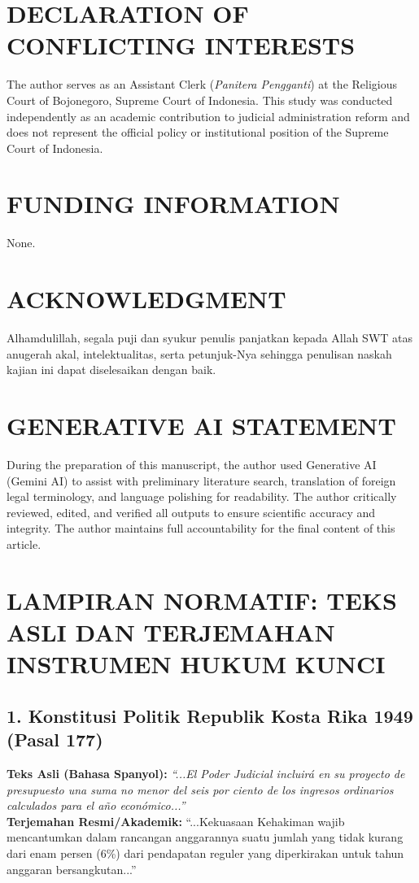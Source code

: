 \documentclass[12pt, a4paper]{article}
\begin{document}
\newpage
\section*{DECLARATION OF CONFLICTING INTERESTS}
The author serves as an Assistant Clerk (\textit{Panitera Pengganti}) at the Religious Court of Bojonegoro, Supreme Court of Indonesia. This study was conducted independently as an academic contribution to judicial administration reform and does not represent the official policy or institutional position of the Supreme Court of Indonesia.

\section*{FUNDING INFORMATION}
None.

\section*{ACKNOWLEDGMENT}
Alhamdulillah, segala puji dan syukur penulis panjatkan kepada Allah SWT atas anugerah akal, intelektualitas, serta petunjuk-Nya sehingga penulisan naskah kajian ini dapat diselesaikan dengan baik.

\section*{GENERATIVE AI STATEMENT}
During the preparation of this manuscript, the author used Generative AI (Gemini AI) to assist with preliminary literature search, translation of foreign legal terminology, and language polishing for readability. The author critically reviewed, edited, and verified all outputs to ensure scientific accuracy and integrity. The author maintains full accountability for the final content of this article.

\newpage
\section*{LAMPIRAN NORMATIF: TEKS ASLI DAN TERJEMAHAN INSTRUMEN HUKUM KUNCI}

\subsection*{1. Konstitusi Politik Republik Kosta Rika 1949 (Pasal 177)}
\noindent\textbf{Teks Asli (Bahasa Spanyol):}
\textit{``...El Poder Judicial incluirá en su proyecto de presupuesto una suma no menor del seis por ciento de los ingresos ordinarios calculados para el año económico...''}
\\[0.3em]
\noindent\textbf{Terjemahan Resmi/Akademik:}
``...Kekuasaan Kehakiman wajib mencantumkan dalam rancangan anggarannya suatu jumlah yang tidak kurang dari enam persen (6\%) dari pendapatan reguler yang diperkirakan untuk tahun anggaran bersangkutan...''
\end{document}
